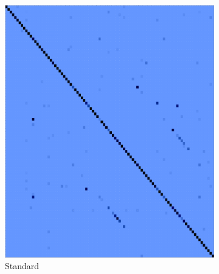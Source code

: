 \begin{figure}[htbp]
    \centering
    \begin{subfigure}[t]{0.25\textwidth}
        \centering
        \includegraphics[width=\textwidth]{images/confusion_matrix.png}
        \caption{Standard}
        \label{fig:confusion_matrix}
    \end{subfigure}
    \hfill
    \begin{subfigure}[t]{0.25\textwidth}
        \centering

\end{subfigure}
\end{figure}
